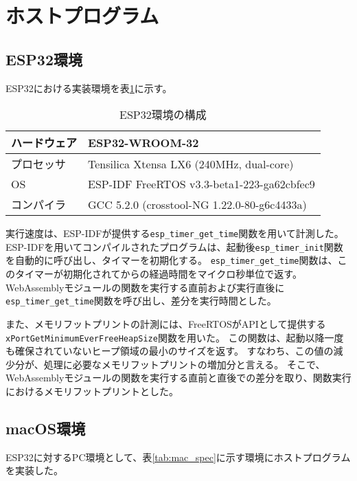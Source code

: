 \section{ホストプログラム}

\subsection{ESP32環境}

ESP32における実装環境を表\ref{tab:esp_spec}に示す。

\begin{table}[htbp]
  \label{tab:esp_spec}
  \caption{ESP32環境の構成}
  \begin{center}
    \begin{tabular}{|l|l|}
    \hline
    ハードウェア & ESP32-WROOM-32 \\ \hline
    プロセッサ & Tensilica Xtensa LX6 (240MHz, dual-core) \\ \hline
    OS & ESP-IDF FreeRTOS v3.3-beta1-223-ga62cbfec9 \\ \hline
    コンパイラ & GCC 5.2.0 (crosstool-NG 1.22.0-80-g6c4433a) \\ \hline
    \end{tabular}
  \end{center}
\end{table}

実行速度は、ESP-IDFが提供する\verb|esp_timer_get_time|関数を用いて計測した。
ESP-IDFを用いてコンパイルされたプログラムは、起動後\verb|esp_timer_init|関数を自動的に呼び出し、タイマーを初期化する。
\verb|esp_timer_get_time|関数は、このタイマーが初期化されてからの経過時間をマイクロ秒単位で返す。
WebAssemblyモジュールの関数を実行する直前および実行直後に\verb|esp_timer_get_time|関数を呼び出し、差分を実行時間とした。

また、メモリフットプリントの計測には、FreeRTOSがAPIとして提供する \\
\verb|xPortGetMinimumEverFreeHeapSize|関数を用いた。
この関数は、起動以降一度も確保されていないヒープ領域の最小のサイズを返す。
すなわち、この値の減少分が、処理に必要なメモリフットプリントの増加分と言える。
そこで、WebAssemblyモジュールの関数を実行する直前と直後での差分を取り、関数実行におけるメモリフットプリントとした。

\subsection{macOS環境}

ESP32に対するPC環境として、表\ref{tab:mac_spec}に示す環境にホストプログラムを実装した。

